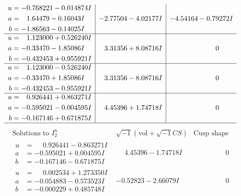 \documentclass[1p]{elsarticle_modified}
\theoremstyle{definition}
\newcommand{\I}{\sqrt{-1}}
\begin{document}
$$\begin{array}{c|c|c}
\begin{aligned}
u &= -0.768221 - 0.014874 I \\
a &= \phantom{-}1.64479 - 0.16043 I \\
b &= -1.86563 - 0.14025 I\end{aligned}
 & -2.77504 - 4.02177 I & -4.54164 - 0.79272 I \\ \hline\begin{aligned}
u &= \phantom{-}1.123000 + 0.526240 I \\
a &= -0.33470 - 1.85086 I \\
b &= -0.432453 + 0.955921 I\end{aligned}
 & \phantom{-}3.31356 + 8.08716 I & \phantom{-0.000000 } 0 \\ \hline\begin{aligned}
u &= \phantom{-}1.123000 - 0.526240 I \\
a &= -0.33470 + 1.85086 I \\
b &= -0.432453 - 0.955921 I\end{aligned}
 & \phantom{-}3.31356 - 8.08716 I & \phantom{-0.000000 } 0 \\ \hline\begin{aligned}
u &= \phantom{-}0.926441 + 0.863271 I \\
a &= -0.595021 - 0.004595 I \\
b &= -0.167146 + 0.671875 I\end{aligned}
 & \phantom{-}4.45396 + 1.74718 I & \phantom{-0.000000 } 0\\
 \hline 
 \end{array}$$\newpage$$\begin{array}{c|c|c}  
\text{Solutions to }I^u_{2}& \I (\text{vol} + \sqrt{-1}CS) & \text{Cusp shape}\\
 \hline 
\begin{aligned}
u &= \phantom{-}0.926441 - 0.863271 I \\
a &= -0.595021 + 0.004595 I \\
b &= -0.167146 - 0.671875 I\end{aligned}
 & \phantom{-}4.45396 - 1.74718 I & \phantom{-0.000000 } 0 \\ \hline\begin{aligned}
u &= \phantom{-}0.002534 + 1.273350 I \\
a &= -0.054883 - 0.573523 I \\
b &= -0.000229 + 0.485748 I\end{aligned}
 & -0.52823 - 2.66079 I & \phantom{-0.000000 } 0 \\ \hline\begin{aligned}

\end{aligned}
\end{array}$$
\end{document}
